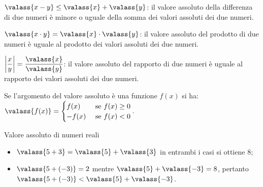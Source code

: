 $\valass{x-y}\le \valass{x}+\valass{y}$: il valore assoluto della differenza di due numeri è minore o uguale della somma dei valori assoluti dei due numeri.

$\valass{x\cdot y}=\valass{x}\cdot \valass{y}$: il valore assoluto del prodotto di due numeri
è uguale al prodotto dei valori assoluti dei due numeri.

$\left |{\dfrac{x}{y}}\right|=\dfrac{\valass{x}}{\valass{y}}$: il valore assoluto del rapporto di due
numeri è uguale al rapporto dei valori assoluti dei due numeri.

Se l'argomento del valore assoluto è una funzione $f(x)$ si ha:$\valass{f(x)}=
\begin{cases}
f(x) & \text{ se }f(x)\ge 0\\
-f(x) & \text{ se }f(x)<0
\end{cases}.$
\begin{exrig}
 \begin{esempio}
 Valore assoluto di numeri reali
 \begin{itemize}
 \item $\valass{5+3}=\valass{5}+\valass{3}$ in entrambi i casi si ottiene $8$;
 \item $\valass{5+(-3)}=2$ mentre $\valass{5}+\valass{-3}=8$, pertanto $\valass{5+(-3)}<\valass{5}+\valass{-3}$.
 \end{itemize}
 \end{esempio}
\end{exrig}

